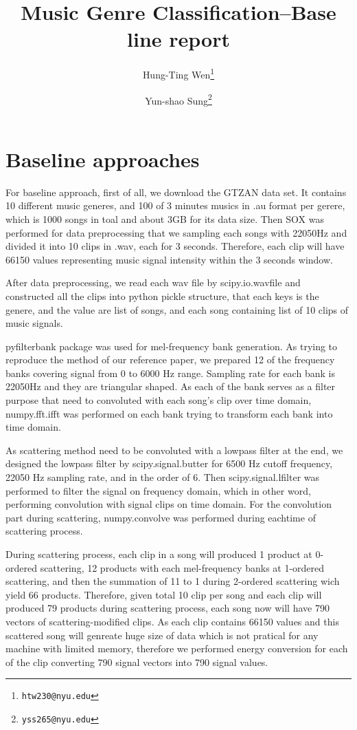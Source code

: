 \documentclass[final]{siamltexmm}
\title{Music Genre Classification--Base line report}
\author{Hung-Ting Wen\thanks{\tt htw230@nyu.edu}
        \and Yun-shao Sung\thanks{\tt yss265@nyu.edu}}
\begin{document}
\maketitle

\begin{abstract}

\end{abstract}

\pagestyle{myheadings}
\thispagestyle{plain}

\section{Baseline approaches}
For baseline approach, first of all, we download the GTZAN data set. It contains 10 different music generes, and 100 of 3 minutes musics in .au format per gerere, which is 1000 songs in toal and about 3GB for its data size. Then SOX was performed for data preprocessing that we sampling each songs with 22050Hz and divided it into 10 clips in .wav, each for 3 seconds. Therefore, each clip will have 66150 values representing music signal intensity within the 3 seconds window.

After data preprocessing, we read each wav file by scipy.io.wavfile and constructed all the clips into python pickle structure, that each keys is the genere, and the value are list of songs, and each song containing list of 10 clips of music signals.

pyfilterbank package was used for mel-frequency bank generation. As trying to reproduce the method of our reference paper, we prepared 12 of the frequency banks covering signal from 0 to 6000 Hz range. Sampling rate for each bank is 22050Hz and they are triangular shaped. As each of the bank serves as a filter purpose that need to convoluted with each song's clip over time domain, numpy.fft.ifft was performed on each bank trying to transform each bank into time domain.

As scattering method need to be convoluted with a lowpass filter at the end, we designed the lowpass filter by scipy.signal.butter for 6500 Hz cutoff frequency, 22050 Hz sampling rate, and in the order of 6. Then scipy.signal.lfilter was performed to filter the signal on frequency domain, which in other word, performing convolution with signal clips on time domain. For the convolution part during scattering, numpy.convolve was performed during eachtime of scattering process.

During scattering process, each clip in a song will produced 1 product at 0-ordered scattering, 12 products with each mel-frequency banks at 1-ordered scattering, and then the summation of 11 to 1 during 2-ordered scattering wich yield 66 products. Therefore, given total 10 clip per song and each clip will produced 79 products during scattering process, each song now will have 790 vectors of scattering-modified clips. As each clip contains 66150 values and this scattered song will genreate huge size of data which is not pratical for any machine with limited memory, therefore we performed energy conversion for each of the clip converting 790 signal vectors into 790 signal values.
\end{document}
